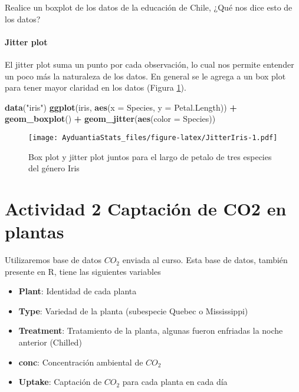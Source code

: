 \documentclass[]{book}
\newenvironment{Shaded}{\begin{snugshade}}{\end{snugshade}}
\newcommand{\KeywordTok}[1]{\textcolor[rgb]{0.13,0.29,0.53}{\textbf{#1}}}
\newcommand{\DataTypeTok}[1]{\textcolor[rgb]{0.13,0.29,0.53}{#1}}
\newcommand{\StringTok}[1]{\textcolor[rgb]{0.31,0.60,0.02}{#1}}
\newcommand{\OperatorTok}[1]{\textcolor[rgb]{0.81,0.36,0.00}{\textbf{#1}}}
\newcommand{\NormalTok}[1]{#1}
\providecommand{\tightlist}{%
  \setlength{\itemsep}{0pt}\setlength{\parskip}{0pt}}
\let\oldparagraph\paragraph
\renewcommand{\paragraph}[1]{\oldparagraph{#1}\mbox{}}
\begin{document}
Realice un boxplot de los datos de la educación de Chile, ¿Qué nos dice
esto de los datos?

\paragraph{Jitter plot}\label{jitter-plot}

El jitter plot suma un punto por cada observación, lo cual nos permite
entender un poco más la naturaleza de los datos. En general se le agrega
a un box plot para tener mayor claridad en los datos (Figura
\ref{fig:JitterIris}).

\begin{Shaded}
\begin{Highlighting}[]
\KeywordTok{data}\NormalTok{(}\StringTok{"iris"}\NormalTok{)}
\KeywordTok{ggplot}\NormalTok{(iris, }\KeywordTok{aes}\NormalTok{(}\DataTypeTok{x =}\NormalTok{ Species, }\DataTypeTok{y =}\NormalTok{ Petal.Length)) }\OperatorTok{+}\StringTok{ }\KeywordTok{geom_boxplot}\NormalTok{() }\OperatorTok{+}\StringTok{ }\KeywordTok{geom_jitter}\NormalTok{(}\KeywordTok{aes}\NormalTok{(}\DataTypeTok{color =}\NormalTok{ Species))}
\end{Highlighting}
\end{Shaded}

\begin{figure}
\centering
\texttt{[image: AyduantiaStats\_files/figure-latex/JitterIris-1.pdf]}
\caption{\label{fig:JitterIris}Box plot y jitter plot juntos para el largo
de petalo de tres especies del género Iris}
\end{figure}

\section{Actividad 2 Captación de CO2 en
plantas}\label{actividad-2-captacion-de-co2-en-plantas}

Utilizaremos base de datos \(CO_2\) \citep{potvin1990statistical}
enviada al curso. Esta base de datos, también presente en R, tiene las
siguientes variables

\begin{itemize}
\tightlist
\item
  \textbf{Plant}: Identidad de cada planta
\item
  \textbf{Type}: Variedad de la planta (subespecie Quebec o Mississippi)
\item
  \textbf{Treatment}: Tratamiento de la planta, algunas fueron enfriadas
  la noche anterior (Chilled)
\item
  \textbf{conc}: Concentración ambiental de \(CO_2\)
\item
  \textbf{Uptake}: Captación de \(CO_2\) para cada planta en cada día
\end{itemize}
\end{document}
